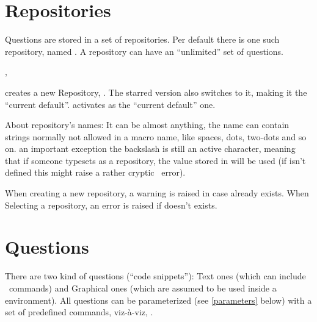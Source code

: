 \documentclass[10pt]{article}
\begin{document}
\section{Repositories}\label{repositories}
Questions are stored in a set of repositories. Per default there is one such repository, named . A repository can have an ``unlimited'' set of questions.

\begin{codedescribe}{,\selectRepository}
\begin{codesyntax}%
\end{codesyntax}
 creates a new Repository, . The starred version also switches to it, making it the ``current default''.
\tsobj{\SelectRepository} activates  as the ``current default'' one.
\end{codedescribe}

\begin{tsremark}
About repository's names: It can be almost anything, the name can contain strings normally not allowed in a macro name, like spaces, dots, two-dots and so on. an important exception the backslash is still an active character, meaning that if someone typesets \tsobj{\XYZ} as a repository, the value stored in \tsobj{\XYZ} will be used (if \tsobj{\XYZ} isn't defined this might raise a rather cryptic \LaTeXe\ error).
\end{tsremark}

\begin{tsremark}
When creating a new repository, a warning is raised  in case  already exists. 
When Selecting a repository, an error is raised if  doesn't exists.
\end{tsremark}


\section{Questions}
There are two kind of questions (``code snippets''): Text ones (which can include \LaTeXe\ commands) and Graphical ones (which are assumed to be used inside a  environment). All questions can be parameterized (see \ref{parameters} below) with a set of predefined commands, viz-à-viz, .
\end{document}

